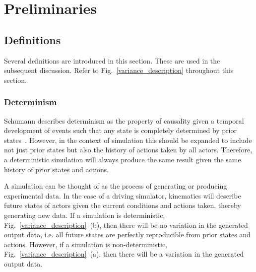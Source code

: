 \documentclass[runningheads,twocolumn,a4paper,10pt]{llncs}
\begin{document}

\section{Preliminaries} \label{s:prelim}

\subsection{Definitions}

Several definitions are introduced in this section. These are used in the subsequent discussion. Refer to Fig.~\ref{variance_description} throughout this section.
\\

\subsubsection{Determinism}
Schumann describes determinism as the property of causality given a temporal development of events such that any state is completely determined by prior states~\cite{Schumann2010}. However, in the context of simulation this should be expanded to include not just prior states but also the history of actions taken by all actors. Therefore, a deterministic simulation will always produce the same result given the same history of prior states and actions.
% 

A simulation can be thought of as the process of generating or producing experimental data. 
%
In the case of a driving simulator, kinematics will describe future states of actors given the current conditions and actions taken, thereby generating new data. 
%
If a simulation is deterministic, Fig.~\ref{variance_description}~(b), then there will be no variation in the generated output data, i.e. all future states are perfectly reproducible from prior states and actions. 
%
However, if a simulation is non-deterministic, Fig.~\ref{variance_description}~(a), then there will be a variation in the generated output data. \\
\end{document}
